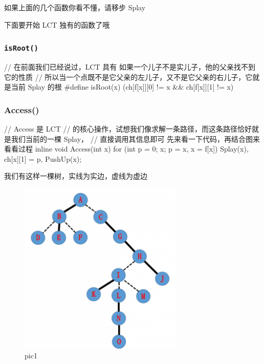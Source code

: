 如果上面的几个函数你看不懂，请移步 Splay  

下面要开始 LCT 独有的函数了哦

\subsubsection{\texttt{isRoot()}}

\begin{cppcode}
// 在前面我们已经说过，LCT 具有 如果一个儿子不是实儿子，他的父亲找不到它的性质
// 所以当一个点既不是它父亲的左儿子，又不是它父亲的右儿子，它就是当前 Splay 的根
#define isRoot(x) (ch[f[x]][0] != x && ch[f[x]][1] != x)
\end{cppcode}

\subsubsection{Access() }

\begin{cppcode}
// Access 是 LCT
// 的核心操作，试想我们像求解一条路径，而这条路径恰好就是我们当前的一棵 Splay，
// 直接调用其信息即可 先来看一下代码，再结合图来看看过程
inline void Access(int x) {
  for (int p = 0; x; p = x, x = f[x]) {
    Splay(x), ch[x][1] = p, PushUp(x);
  }
}
\end{cppcode}

我们有这样一棵树，实线为实边，虚线为虚边 

\begin{figure}[htbp]
\centering
\includegraphics[width=0.7\textwidth]{docs/ds/images/lct1.png} 
\caption{pic1}
\end{figure}

